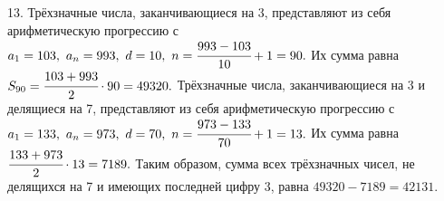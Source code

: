 13. Трёхзначные числа, заканчивающиеся на 3, представляют из себя арифметическую прогрессию с $a_1=103,\ a_n=993,\ d=10,\ n=\cfrac{993-103}{10}+1=90.$ Их сумма равна $S_{90}=\cfrac{103+993}{2}\cdot90=49320.$ Трёхзначные числа, заканчивающиеся на 3 и делящиеся на 7, представляют из себя арифметическую прогрессию с $a_1=133,\ a_n=973,\ d=70,\ n=\cfrac{973-133}{70}+1=13.$ Их сумма равна $\cfrac{133+973}{2}\cdot13=7189.$ Таким образом, сумма всех трёхзначных чисел, не делящихся на 7 и имеющих последней цифру 3, равна $49320-7189=42131.$\\
